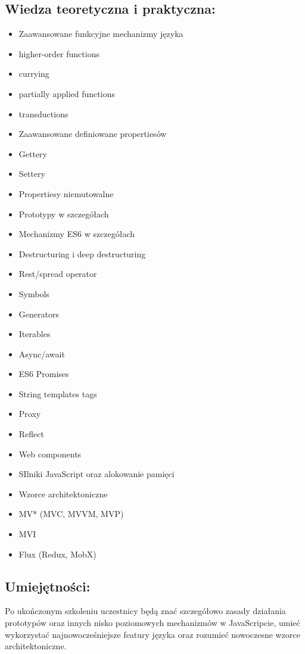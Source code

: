 \documentclass{article}[10pt]
\begin{document}
	\subsection*{Wiedza teoretyczna i praktyczna:}
\begin{adjustwidth}{1.5cm}{}
	\begin{itemize}
		\item Zaawansowane funkcyjne mechanizmy języka
		\item higher-order functions
		\item currying
		\item partially applied functions
		\item transductions
		\item Zaawansowane definiowane propertiesów
		\item Gettery
		\item Settery
		\item Propertiesy niemutowalne
		\item Prototypy w szczegółach
		\item Mechanizmy ES6 w szczegółach
		\item Destructuring i deep destructuring
		\item Rest/spread operator
		\item Symbols
		\item Generators
		\item Iterables
		\item Async/await
		\item ES6 Promises
		\item String templates tags
		\item Proxy
		\item Reflect
		\item Web components
		\item SIlniki JavaScript oraz alokowanie pamięci
		\item Wzorce architektoniczne
		\item MV* (MVC, MVVM, MVP)
		\item MVI
		\item Flux (Redux, MobX)
	\end{itemize}
\end{adjustwidth}

	\subsection*{Umiejętności:}
\begin{adjustwidth}{2cm}{}
\justifying
	
Po ukończonym szkoleniu uczestnicy będą znać szczegółowo zasady działania prototypów oraz innych nisko poziomowych mechanizmów w JavaScripcie, umieć wykorzystać najnowocześniejsze featury języka oraz rozumieć nowoczesne wzorce architektoniczne.

\end{adjustwidth}
\end{document}

